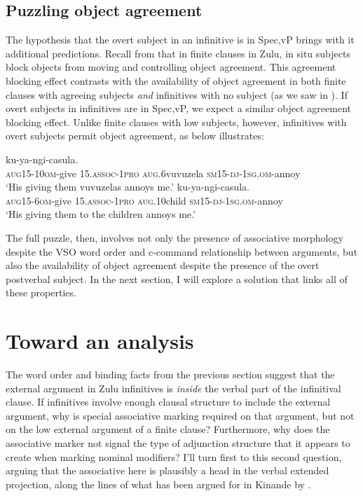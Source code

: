 \documentclass[output=paper,colorlinks,citecolor=brown]{langscibook}
\begin{document}
\subsection{Puzzling object agreement}\label{sec:halpert:3.2}

The hypothesis that the overt subject in an infinitive is in Spec,vP brings with it additional predictions.  Recall from  that in finite clauses in Zulu, in situ subjects block objects from moving and controlling object agreement. This agreement blocking effect contrasts with the availability of object agreement in both finite clauses with agreeing subjects \textit{and}  infinitives with no subject (as we saw in ). If overt subjects in infinitives are in Spec,vP, we expect a similar object agreement blocking effect.  Unlike finite clauses with low subjects, however, infinitives with overt subjects permit object agreement, as  below illustrates:

\ea%
    \label{ex:halpert:18}
    \ea%
    \label{ex:halpert:18a}
     ku-ya-ngi-casula.\\
            \textsc{aug}15-10\textsc{om}-give 15.\textsc{assoc-1pro} \textsc{aug}.6vuvuzela \textsc{sm}15-\textsc{dj}-1\textsc{sg.om}-annoy \\
    \glt    `His giving them vuvuzelas annoys me.'
    \ex%
    \label{ex:halpert:18b}
     ku-ya-ngi-casula.\\
            \textsc{aug}15-6\textsc{om}-give 15.\textsc{assoc-1pro} \textsc{aug}.10child \textsc{sm}15-\textsc{dj}-1\textsc{sg.om}-annoy \\
    \glt    `His giving them to the children annoys me.'
    \z 
\z 

The full puzzle, then, involves not only the presence of associative morphology despite the VSO word order and c-command relationship between arguments, but also the availability of object agreement despite the presence of the overt postverbal subject.  In the next section, I will explore a solution that links all of these properties.

\section{Toward an analysis}\label{sec:halpert:4}

The word order and binding facts from the previous section suggest that the external argument in Zulu infinitives is \textit{inside} the verbal part of the infinitival clause. If infinitives involve enough clausal structure to include the external argument, why is special associative marking required on that argument, but not on the low external argument of a finite clause? Furthermore, why does the associative marker not signal the type of adjunction structure that it appears to create when marking nominal modifiers?  I'll turn first to this second question, arguing that the associative here is plausibly a head in the verbal extended projection, along the lines of what has been argued for in Kinande by \citet{BakerCollins2006}.
\end{document}
